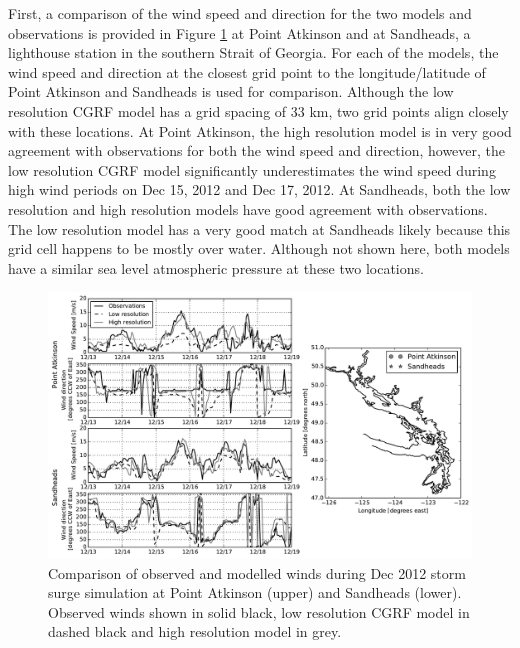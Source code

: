 \documentclass[pdftex,10pt]{article}
\begin{document}
First, a comparison of the wind speed and direction for the two models and observations is provided in Figure \ref{fig:dec2012_weather} at Point Atkinson and at Sandheads, a lighthouse station in the southern Strait of Georgia. For each of the models, the wind speed and direction at the closest grid point to the longitude/latitude of Point Atkinson and Sandheads is used for comparison. Although the low resolution CGRF model has a grid spacing of 33 km, two grid points align closely with these locations. At Point Atkinson, the high resolution model is in very good agreement with observations for both the wind speed and direction, however, the low resolution CGRF model significantly underestimates the wind speed during high wind periods on Dec 15, 2012 and Dec 17, 2012. At Sandheads, both the low resolution and high resolution models have good agreement with observations. The low resolution model has a very good match at Sandheads likely because this grid cell happens to be mostly over water. Although not shown here, both models have a similar sea level atmospheric pressure at these two locations.


\begin{figure}
\centering
\includegraphics[scale=0.6]{Figures/dec2012_weather.pdf}
\caption{Comparison of observed and modelled winds during Dec 2012 storm surge simulation at Point Atkinson (upper) and Sandheads (lower). Observed winds shown in solid black, low resolution CGRF model in dashed black and high resolution model in grey. }
\label{fig:dec2012_weather}
\end{figure}
\end{document}
